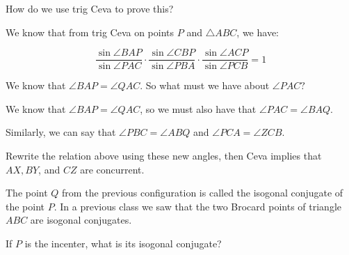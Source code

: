 
How do we use trig Ceva to prove this?


We know that from trig Ceva on points $P$ and $\triangle ABC$, we have:

$$\frac{\sin\angle BAP}{\sin\angle PAC}\cdot \frac{\sin\angle CBP}{\sin\angle PBA}\cdot \frac{\sin\angle ACP}{\sin\angle PCB} = 1$$

We know that $\angle BAP = \angle QAC$. So what must we have about $\angle PAC ?$






We know that $\angle BAP = \angle QAC$, so we must also have that $\angle PAC = \angle BAQ$.

Similarly, we can say that $\angle PBC = \angle ABQ$ and $\angle PCA=\angle ZCB$.

Rewrite the relation above using these new angles, then Ceva implies that $AX, BY$, and $CZ$ are concurrent.

The point $Q$ from the previous configuration is called the isogonal conjugate of the point $P$. In a previous class we saw that the two Brocard points of triangle $ABC$ are isogonal conjugates.

If $P$ is the incenter, what is its isogonal conjugate?


